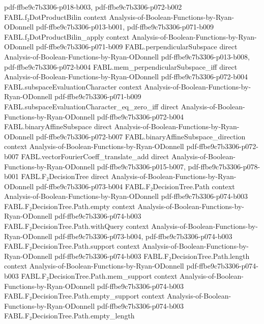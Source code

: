 \begin{theorem}
  {pdf-ffbe9c7b3306-p018-b003,
    pdf-ffbe9c7b3306-p072-b002}
\proofstep
  {FABL.f₂DotProductBilin}
  {context}
  {Analysis-of-Boolean-Functions-by-Ryan-ODonnell}
  {pdf-ffbe9c7b3306-p013-b001,
    pdf-ffbe9c7b3306-p071-b009}
\proofstep
  {FABL.f₂DotProductBilin_apply}
  {context}
  {Analysis-of-Boolean-Functions-by-Ryan-ODonnell}
  {pdf-ffbe9c7b3306-p071-b009}
\proofstep
  {FABL.perpendicularSubspace}
  {direct}
  {Analysis-of-Boolean-Functions-by-Ryan-ODonnell}
  {pdf-ffbe9c7b3306-p013-b008,
    pdf-ffbe9c7b3306-p072-b004}
\proofstep
  {FABL.mem_perpendicularSubspace_iff}
  {direct}
  {Analysis-of-Boolean-Functions-by-Ryan-ODonnell}
  {pdf-ffbe9c7b3306-p072-b004}
\proofstep
  {FABL.subspaceEvaluationCharacter}
  {context}
  {Analysis-of-Boolean-Functions-by-Ryan-ODonnell}
  {pdf-ffbe9c7b3306-p071-b009}
\proofstep
  {FABL.subspaceEvaluationCharacter_eq_zero_iff}
  {direct}
  {Analysis-of-Boolean-Functions-by-Ryan-ODonnell}
  {pdf-ffbe9c7b3306-p072-b004}
\proofstep
  {FABL.binaryAffineSubspace}
  {direct}
  {Analysis-of-Boolean-Functions-by-Ryan-ODonnell}
  {pdf-ffbe9c7b3306-p072-b007}
\proofstep
  {FABL.binaryAffineSubspace_direction}
  {context}
  {Analysis-of-Boolean-Functions-by-Ryan-ODonnell}
  {pdf-ffbe9c7b3306-p072-b007}
\proofstep
  {FABL.vectorFourierCoeff_translate_add}
  {direct}
  {Analysis-of-Boolean-Functions-by-Ryan-ODonnell}
  {pdf-ffbe9c7b3306-p015-b007,
    pdf-ffbe9c7b3306-p078-b001}
\proofstep
  {FABL.F₂DecisionTree}
  {direct}
  {Analysis-of-Boolean-Functions-by-Ryan-ODonnell}
  {pdf-ffbe9c7b3306-p073-b004}
\proofstep
  {FABL.F₂DecisionTree.Path}
  {context}
  {Analysis-of-Boolean-Functions-by-Ryan-ODonnell}
  {pdf-ffbe9c7b3306-p074-b003}
\proofstep
  {FABL.F₂DecisionTree.Path.empty}
  {context}
  {Analysis-of-Boolean-Functions-by-Ryan-ODonnell}
  {pdf-ffbe9c7b3306-p074-b003}
\proofstep
  {FABL.F₂DecisionTree.Path.withQuery}
  {context}
  {Analysis-of-Boolean-Functions-by-Ryan-ODonnell}
  {pdf-ffbe9c7b3306-p073-b004,
    pdf-ffbe9c7b3306-p074-b003}
\proofstep
  {FABL.F₂DecisionTree.Path.support}
  {context}
  {Analysis-of-Boolean-Functions-by-Ryan-ODonnell}
  {pdf-ffbe9c7b3306-p074-b003}
\proofstep
  {FABL.F₂DecisionTree.Path.length}
  {context}
  {Analysis-of-Boolean-Functions-by-Ryan-ODonnell}
  {pdf-ffbe9c7b3306-p074-b003}
\proofstep
  {FABL.F₂DecisionTree.Path.mem_support}
  {context}
  {Analysis-of-Boolean-Functions-by-Ryan-ODonnell}
  {pdf-ffbe9c7b3306-p074-b003}
\proofstep
  {FABL.F₂DecisionTree.Path.empty_support}
  {context}
  {Analysis-of-Boolean-Functions-by-Ryan-ODonnell}
  {pdf-ffbe9c7b3306-p074-b003}
\proofstep
  {FABL.F₂DecisionTree.Path.empty_length}

\end{theorem}
